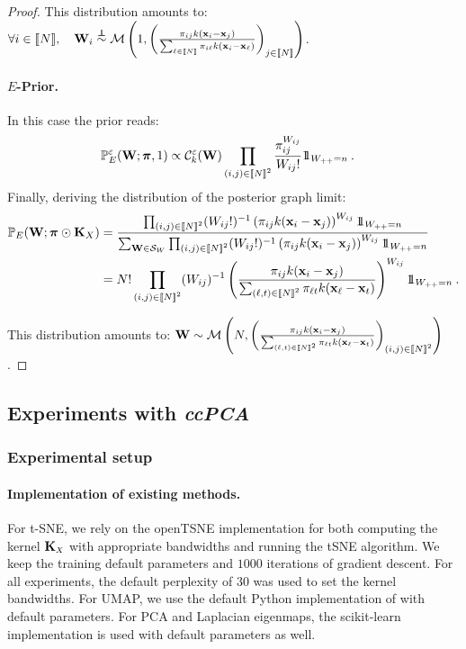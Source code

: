 \begin{proof}
This distribution amounts to: $\forall i \in \integ{N}, \quad \W_{i} \stackrel{\perp\!\!\!\!\perp}{\sim} \mathcal{M}\left(1, \left(\frac{\pi_{ij} k(\mathbf{x}_i - \mathbf{x}_j)}{\sum_{\ell \in \integ{N}} \pi_{i\ell} k(\mathbf{x}_i - \mathbf{x}_{\ell})}\right)_{j \in \integ{N}}\right)$.

\paragraph{$E$-Prior.}
In this case the prior reads:
\begin{align*}
    \mathbb{P}_{E}^{\varepsilon}({\mathbf{W}}; \bm{\pi}, 1) &\propto \mathcal{C}_{k}^{\varepsilon}({\mathbf{W}}) \prod_{(i,j) \in {[\![N]\!]}^2} \frac{\pi_{ij}^{W_{ij}}}{W_{ij}!} 1\!\!1_{W_{++} = n} \:.
\end{align*}
Finally, deriving the distribution of the posterior graph limit:
\begin{align*}
    \mathbb{P}_{E}(\W ;\bm{\pi} \odot \mK_{X}) &= \frac{\prod_{(i,j) \in \integ{N}^2}  (W_{ij}!)^{-1}\left(\pi_{ij} k(\mathbf{x}_i - \mathbf{x}_j)\right)^{W_{ij}} \ind_{W_{++} = n}}{\sum_{\W \in \mathcal{S}_{W}} \prod_{(i,j) \in \integ{N}^2} (W_{ij}!)^{-1} \left(\pi_{ij} k(\mathbf{x}_i - \mathbf{x}_j)\right)^{W_{ij}} \ind_{W_{++} = n}} \\
    &= N! \prod_{(i,j) \in \integ{N}^2} (W_{ij})^{-1} \left(\frac{\pi_{ij} k(\mathbf{x}_i - \mathbf{x}_j)}{\sum_{(\ell,t) \in \integ{N}^2} \pi_{\ell t} k(\mathbf{x}_{\ell} - \mathbf{x}_t)}\right)^{W_{ij}} \ind_{W_{++} = n} \:.
\end{align*}

This distribution amounts to: $\mathbf{W} \sim \mathcal{M}\left(N, \left(\frac{\pi_{ij} k(\mathbf{x}_i - \mathbf{x}_j)}{\sum_{(\ell,t) \in {[\![N]\!]}^2} \pi_{\ell t} k(\mathbf{x}_{\ell} - \mathbf{x}_t)}\right)_{(i,j) \in {[\![N]\!]}^2}\right)$.
\end{proof}


\subsection{Experiments with \textit{ccPCA}}\label{sec:cc_pca_exps}

\subsubsection{Experimental setup}\label{sec:setup_ccpca}

\paragraph{Implementation of existing methods.} For t-SNE, we rely on the openTSNE implementation \citep{polivcar2019opentsne} for both computing the kernel $\mK_{\scaleto{X}{4pt}}$ with appropriate bandwidths and running the tSNE algorithm. We keep the training default parameters and $1000$ iterations of gradient descent. For all experiments, the default perplexity of $30$ was used to set the kernel bandwidths. For UMAP, we use the default Python implementation of \citep{mcinnes2018umap} with default parameters. For PCA and Laplacian eigenmaps, the scikit-learn implementation is used \citep{pedregosa2011scikit} with default parameters as well. 

